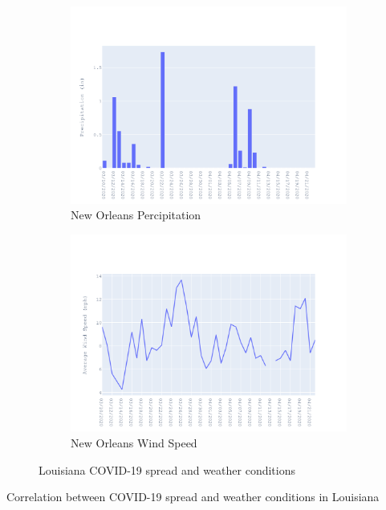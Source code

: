 \documentclass{homework}
\begin{document}
\begin{figure}[H]
  \begin{subfigure}{0.45\linewidth}
    \includegraphics[width=\linewidth]{task4/Louisiana_rain.png}
    \caption{New Orleans Percipitation}
  \end{subfigure}
  \hfil
  \begin{subfigure}{0.45\linewidth}
    \includegraphics[width=\linewidth]{task4/Louisiana_wnd.png}
    \caption{New Orleans Wind Speed}
  \end{subfigure}

  \caption{Louisiana COVID-19 spread and weather conditions}
  \label{fig:task4CA}
\end{figure}

\begin{table}[H]
  \caption{Correlation between COVID-19 spread and weather conditions in Louisiana}
  \label{Task 4 Louisiana}
  \centering
  
\end{table}
\end{document}
